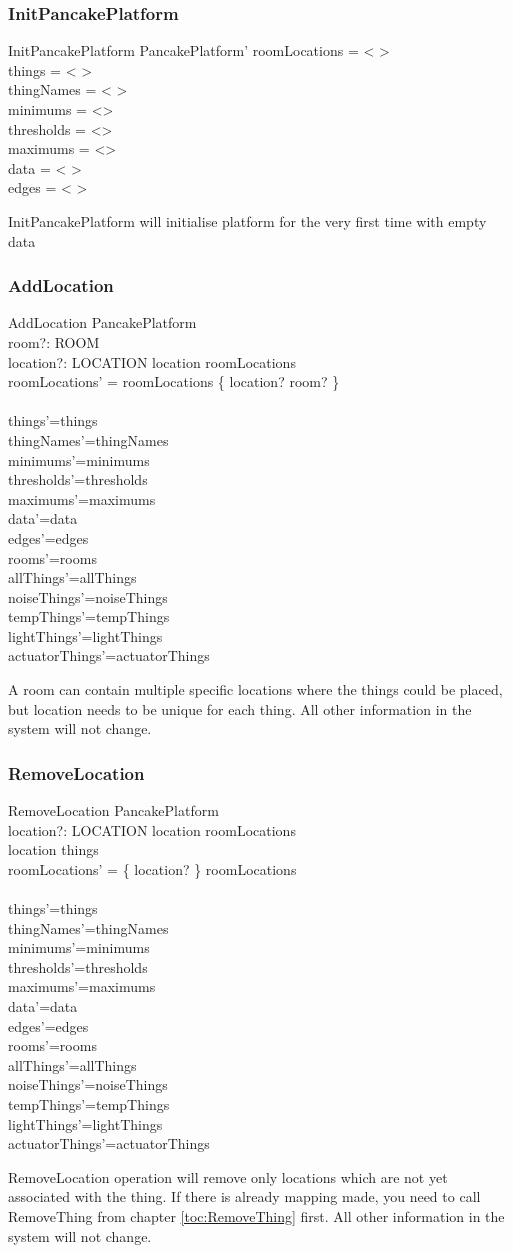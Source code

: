\documentclass{article}
\newcommand{\same}[1]{\\{#1}'={#1}}
\newcommand{\sameObvious}[1]{\same{rooms}\same{allThings}\same{noiseThings}\same{tempThings}\same{lightThings}\same{actuatorThings}  }
\begin{document}
\label{toc:InitPancakePlatform}
\subsubsection{InitPancakePlatform}
\begin{schema}{InitPancakePlatform}
  PancakePlatform'
\where
  roomLocations = < > \\
  things = < > \\
  thingNames = < > \\
  minimums = <> \\
  thresholds = <> \\
  maximums = <> \\
  data =  < > \\
  edges =  < > \\
\end{schema}
InitPancakePlatform will initialise platform for the very first time with empty data


\label{toc:AddLocation}
\subsubsection{AddLocation}
\begin{schema}{AddLocation}
  \Delta PancakePlatform \\
  room?: ROOM \\
  location?: LOCATION
\where
  location \notin \dom roomLocations \\
  roomLocations' = roomLocations \cup \{ location? \mapsto room? \} \\

  \same{things}
  \same{thingNames}
  \same{minimums}
  \same{thresholds}
  \same{maximums}
  \same{data}
  \same{edges}
  \sameObvious{}
\end{schema}
A room can contain multiple specific locations where the things could be placed, but location needs to be unique for each thing. All other information in the system will not change.


\newpage
\label{toc:RemoveLocation}
\subsubsection{RemoveLocation}
\begin{schema}{RemoveLocation}
  \Delta PancakePlatform \\
  location?: LOCATION
\where
  location \in \dom roomLocations \\
  location \notin \ran things \\
  roomLocations' = \{ location? \} \ndres roomLocations \\ 
  
  \same{things}
  \same{thingNames}
  \same{minimums}
  \same{thresholds}
  \same{maximums}
  \same{data}
  \same{edges}
  \sameObvious{}
\end{schema}
RemoveLocation operation will remove only locations which are not yet associated with the thing. If there is already mapping made, you need to call RemoveThing from chapter \ref{toc:RemoveThing} first. All other information in the system will not change.
\end{document}
